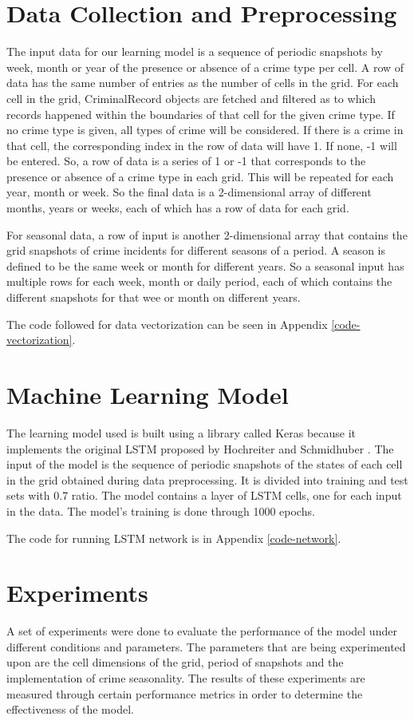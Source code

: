 \section{Data Collection and Preprocessing}
    The input data for our learning model is a sequence of periodic snapshots by week, month or year of the presence or absence of a crime type per cell. A row of data has the same number of entries as the number of cells in the grid. For each cell in the grid, CriminalRecord objects are fetched and filtered as to which records happened within the boundaries of that cell for the given crime type. If no crime type is given, all types of crime will be considered. If there is a crime in that cell, the corresponding index in the row of data will have 1. If none, -1 will be entered. So, a row of data is a series of 1 or -1 that corresponds to the presence or absence of a crime type in each grid. This will be repeated for each year, month or week. So the final data is a 2-dimensional array of different months, years or weeks, each of which has a row of data for each grid.

    For seasonal data, a row of input is another 2-dimensional array that contains the grid snapshots of crime incidents for different seasons of a period. A season is defined to be the same week or month for different years. So a seasonal input has multiple rows for each week, month or daily period, each of which contains the different snapshots for that wee or month on different years.

    The code followed for data vectorization can be seen in Appendix \ref{code-vectorization}.

\section{Machine Learning Model}
    The learning model used is built using a library called Keras because it implements the original LSTM proposed by Hochreiter and Schmidhuber \citeyearpar{hochreiter1997long}. The input of the model is the sequence of periodic snapshots of the states of each cell in the grid obtained during data preprocessing. It is divided into training and test sets with 0.7 ratio. The model contains a layer of LSTM cells, one for each input in the data. The model's training is done through 1000 epochs.

    The code for running LSTM network is in Appendix \ref{code-network}.

\section{Experiments}
    A set of experiments were done to evaluate the performance of the model under different conditions and parameters. The parameters that are being experimented upon are the cell dimensions of the grid, period of snapshots and the implementation of crime seasonality. The results of these experiments are measured through certain performance metrics in order to determine the effectiveness of the model.

